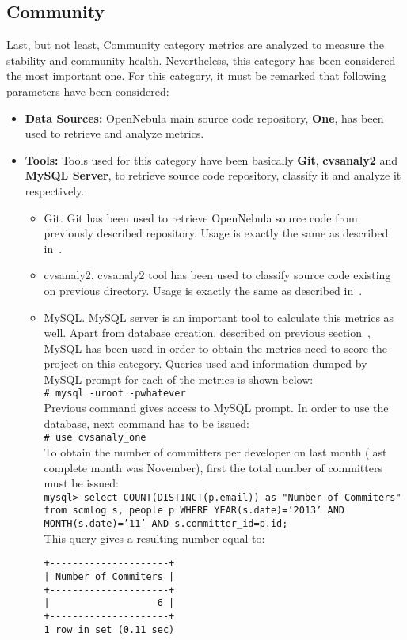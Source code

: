 \documentclass[11pt]{article}
\newcommand{\shellcmd}[1]{\\\indent\indent\texttt{\# #1}\\}
\newcommand{\mysqlcmd}[1]{\\\indent\indent\texttt{mysql> #1}\\}
\begin{document}
\subsection{Community}
Last, but not least, Community category metrics are analyzed to measure the stability and community health. Nevertheless, this category has been considered the most important one. For this category, it must be remarked that following parameters have been considered:
\begin{itemize}\itemsep0pt
\item{\textbf{Data Sources:}} OpenNebula main source code repository, \textbf{One}, has been used to retrieve and analyze metrics. 
\item{\textbf{Tools:}} Tools used for this category have been basically \textbf{Git}, \textbf{cvsanaly2} and \textbf{MySQL Server}, to retrieve source code repository, classify it and analyze it respectively. 
\begin{itemize}\itemsep0pt
\item{Git.} Git has been used to retrieve OpenNebula source code from previously described repository. Usage is exactly the same as described in~.
\item{cvsanaly2.} cvsanaly2 tool has been used to classify source code existing on previous directory. Usage is exactly the same as described in~.
\item{MySQL.} MySQL server is an important tool to calculate this metrics as well. Apart from database creation, described on previous section~, MySQL has been used in order to obtain the metrics need to score the project on this category. Queries used and information dumped by MySQL prompt for each of the metrics is shown below:
\shellcmd{mysql -uroot -pwhatever}
Previous command gives access to MySQL prompt. In order to use the database, next command has to be issued:
\shellcmd{use cvsanaly\_one}
To obtain the number of committers per developer on last month (last complete month was November), first the total number of committers must be issued:
\mysqlcmd{select COUNT(DISTINCT(p.email)) as "Number of Commiters" from scmlog s, people p WHERE YEAR(s.date)='2013' AND MONTH(s.date)='11' AND s.committer\_id=p.id;}
This query gives a resulting number equal to:
\begin{verbatim}
+---------------------+
| Number of Commiters |
+---------------------+
|                   6 |
+---------------------+
1 row in set (0.11 sec)
\end{verbatim}

\end{itemize}
\end{itemize}
\end{document}
